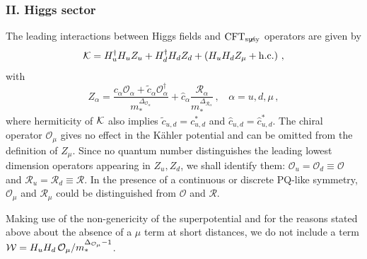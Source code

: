 \documentclass[a4paper,12pt]{article}
\newcommand{\hc}{{\rm h.c.}}
\newcommand{\beq}{\begin{equation}}
\newcommand{\eeq}{\end{equation}}
\def\O{\mathcal{O}}
\def\R{\mathcal{R}}
\def\mst{m_*}
\def\CFTs{{\rm CFT}_ {{\rm susy}\! \! \! \! \! \! \! \!\diagup \,\,\,}}
\begin{document}
\boldmath
\subsubsection*{II. Higgs sector}
\unboldmath

The leading interactions between Higgs fields and $\CFTs$ operators  are given by
\beq
{\cal K} = H_u^\dagger H_u Z_u + H_d^\dagger H_d Z_d + \left( H_u H_d Z_\mu + \hc \right) \, ,
\label{kalH}
\eeq
with
\beq
Z_\alpha=  \frac{c_\alpha \O_\alpha+  \tilde c_\alpha \O_\alpha^\dagger}{\mst^{\Delta_{\O_\alpha}}} +  \hat c_\alpha\frac{\R_\alpha}{\mst^{\Delta_{\R_\alpha}}} \, , ~~~~
\alpha=u,d,\mu \, ,
\label{defZH}
\eeq
where hermiticity of ${\cal K}$ also implies $\tilde c_{u,d}=c_{u,d}^*$ and $\hat c_{u,d}=\hat c_{u,d}^*$.
 The chiral operator $\O_\mu$ gives no effect in the K\"ahler potential and can be omitted from the definition of $Z_\mu$. Since no quantum number distinguishes the leading lowest dimension operators appearing in $Z_u, Z_d$, we shall identify them:  $\O_u=\O_d\equiv \O$ and $\R_u= \R_d\equiv \R$. In the presence of a continuous or discrete PQ-like symmetry, $\O_\mu$ and $\R_\mu$ could be distinguished from $\O$ and $\R$.

Making use of the non-genericity of the superpotential and for the reasons stated above about the absence of a $\mu$ term at short distances, we do not include a term ${\cal W} = H_u H_d \, {\O_{\mu}}/{\mst^{\Delta_{\O_{\mu}}-1}}$.


\boldmath
\end{document}
